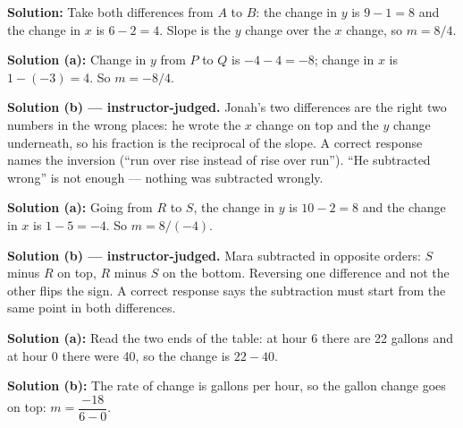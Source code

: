 \documentclass[12pt]{article}
\begin{document}




\textbf{Solution:} Take both differences from $A$ to $B$: the change in $y$ is
$9 - 1 = 8$ and the change in $x$ is $6 - 2 = 4$. Slope is the $y$ change over
the $x$ change, so $m = 8/4$. 


\textbf{Solution (a):} Change in $y$ from $P$ to $Q$ is $-4 - 4 = -8$; change
in $x$ is $1 - (-3) = 4$. So $m = -8/4$. 

\textbf{Solution (b) --- instructor-judged.} Jonah's two differences are the
right two numbers in the wrong places: he wrote the $x$ change on top and the
$y$ change underneath, so his fraction is the reciprocal of the slope. A
correct response names the inversion (``run over rise instead of rise over
run''). ``He subtracted wrong'' is not enough --- nothing was subtracted
wrongly.


\textbf{Solution (a):} Going from $R$ to $S$, the change in $y$ is
$10 - 2 = 8$ and the change in $x$ is $1 - 5 = -4$. So $m = 8/(-4)$.

\textbf{Solution (b) --- instructor-judged.} Mara subtracted in opposite
orders: $S$ minus $R$ on top, $R$ minus $S$ on the bottom. Reversing one
difference and not the other flips the sign. A correct response says the
subtraction must start from the same point in both differences.


\textbf{Solution (a):} Read the two ends of the table: at hour 6 there are
22 gallons and at hour 0 there were 40, so the change is $22 - 40$.

\textbf{Solution (b):} The rate of change is gallons per hour, so the gallon
change goes on top: $m = \dfrac{-18}{6 - 0}$. 
\end{document}
